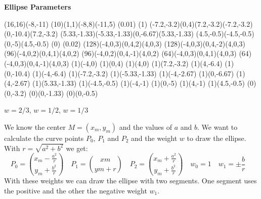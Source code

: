 

\def\fr{\displaystyle\frac}



\begin{center}
{\Huge \bf{Ellipse Parameters}}
\bigskip

\begin{lapdf}(16,16)(-8,-11)
 \Lingrid(10)(1,1)(-8,8)(-11,5)
 \Setwidth(0.01)
 \Dash(1)
 \Polygon(-7.2,-3.2)(0,4)(7.2,-3.2)(-7.2,-3.2)(0,-10.4)(7.2,-3.2) \Stroke
 \Polygon(5.33,-1.33)(-5.33,-1.33)(0,-6.67)(5.33,-1.33) \Stroke
 \Polygon(4.5,-0.5)(-4.5,-0.5)(0,-5)(4.5,-0.5) \Stroke
 \Dash(0)
 \Setwidth(0.02)
 \Red
 \Rcurve(128)(-4,0,3)(0,4,2)(4,0,3) \Stroke
 \Rcurve(128)(-4,0,3)(0,4,-2)(4,0,3) \Stroke
 \Green
 \Rcurve(96)(-4,0,2)(0,4,1)(4,0,2) \Stroke
 \Rcurve(96)(-4,0,2)(0,4,-1)(4,0,2) \Stroke
 \Blue
 \Rcurve(64)(-4,0,3)(0,4,1)(4,0,3) \Stroke
 \Rcurve(64)(-4,0,3)(0,4,-1)(4,0,3) \Stroke
 \Point(1)(-4,0)
 \Point(1)(0,4)
 \Point(1)(4,0)
 \Point(1)(7.2,-3.2)
 \Point(1)(4,-6.4)
 \Point(1)(0,-10.4)
 \Point(1)(-4,-6.4)
 \Point(1)(-7.2,-3.2)
 \Point(1)(-5.33,-1.33)
 \Point(1)(-4,-2.67)
 \Point(1)(0,-6.67)
 \Point(1)(4,-2.67)
 \Point(1)(5.33,-1.33)
 \Point(1)(-4.5,-0.5)
 \Point(1)(-4,-1)
 \Point(1)(0,-5)
 \Point(1)(4,-1)
 \Point(1)(4.5,-0.5)
 \Point(0)(0,-3.2)
 \Point(0)(0,-1.33)
 \Point(0)(0,-0.5)
\end{lapdf}
{\large $w=2/3$, $w=1/2$, $w=1/3$}
\end{center}
\parskip0.2cm
We know the center $M=(x_m,y_m)$ and the values of $a$ and $b$. We want
to calculate the curve points $P_0$, $P_1$ and $P_2$ and the weight
$w$ to draw the ellipse. With $r=\sqrt{a^2+b^2}$ we get:
\begin{equation}
P_0={{x_m-\fr{a^2}{r}}\choose{y_m+\fr{b^2}{r}}} \quad
P_1={{xm}\choose{ym+r}} \quad
P_2={{x_m+\fr{a^2}{r}}\choose{y_m+\fr{b^2}{r}}} \quad
w_0=1 \quad
w_1=\pm\fr{b}{r} \quad
\end{equation}
With these weights we can draw the ellipse with two segments. One segment
uses the positive and the other the negative weight $w_1$.

